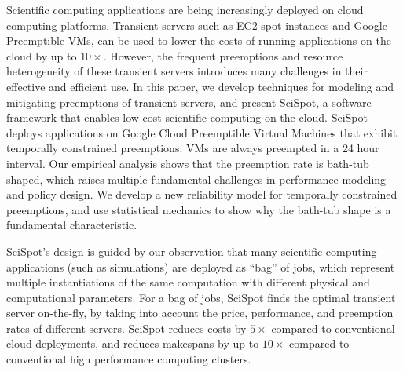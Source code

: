 Scientific computing applications are being increasingly deployed on cloud computing platforms.
Transient servers such as EC2 spot instances and Google Preemptible VMs, can be used to lower the costs of running applications on the cloud by up to $10\times$. 
However, the frequent preemptions and resource heterogeneity of these transient servers introduces many challenges in their effective and efficient use. 
In this paper, we develop techniques for modeling and mitigating preemptions of transient servers, and present SciSpot, a software framework that enables low-cost scientific computing on the cloud. 
SciSpot deploys applications on Google Cloud Preemptible Virtual Machines that exhibit temporally constrained preemptions: VMs are always preempted in a 24 hour interval. 
Our empirical analysis shows that the preemption rate is bath-tub shaped, which raises multiple fundamental challenges in performance modeling and policy design. 
We develop a new reliability model for temporally constrained preemptions, and use statistical mechanics to show why the bath-tub shape is a fundamental characteristic. 


SciSpot's design is guided by our observation that many scientific computing applications (such as simulations) are deployed as ``bag'' of jobs, which represent multiple instantiations of the same computation with different physical and computational parameters. 
For a bag of jobs, SciSpot finds the optimal transient server on-the-fly, by taking into account the price, performance, and preemption rates of different servers. 
SciSpot reduces costs by $5\times$ compared to conventional cloud deployments, and reduces  makespans by up to $10\times$ compared to conventional high performance computing clusters.



